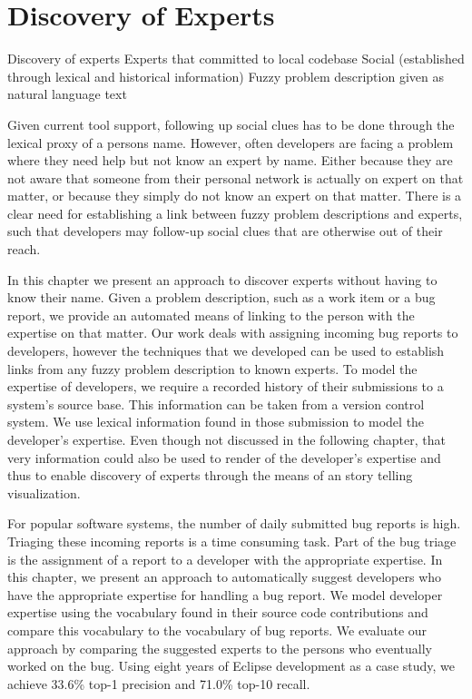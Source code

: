 \documentclass[10pt]{book}
\begin{document}

\chapter{Discovery of Experts}
\label{the chapter on bug reports}

\infobox
	{Discovery of experts}
	{Experts that committed to local codebase}
	{Social (established through lexical and historical information)}
	{Fuzzy problem description given as natural language text}

Given current tool support, following up social clues has to be done through the lexical proxy of a persons name. However, often developers are facing a problem where they need help but not know an expert by name. Either because they are not aware that someone from their personal network is actually on expert on that matter, or because they simply do not know an expert on that matter. There is a clear need for establishing a link between fuzzy problem descriptions and experts, such that developers may follow-up social clues that are otherwise out of their reach. 

In this chapter we present an approach to discover experts without having to know their name. Given a problem description, such as a work item or a bug report, we provide an automated means of linking to the person with the expertise on that matter. Our work deals with assigning incoming bug reports to developers, however the techniques that we developed can be used to establish links from any fuzzy problem description to known experts. To model the expertise of developers, we require a recorded history of their submissions to a system's source base. This information can be taken from a version control system. We use lexical information found in those submission to model the developer's expertise. Even though not discussed in the following chapter, that very information could also be used to render \EVOCLOUDS of the developer's expertise and thus to enable discovery of experts through the means of an story telling visualization.

\asteriskasteriskasterisk

For popular software systems, the number of daily submitted bug reports is high. Triaging these incoming reports is a time consuming task. Part of the bug triage is the assignment of a report to a developer with the appropriate expertise. In this chapter, we present an approach to automatically suggest developers who have the appropriate expertise for handling a bug report. We model developer expertise using the vocabulary found in their source code contributions and compare this vocabulary to the vocabulary of bug reports. We evaluate our approach by comparing the suggested experts to the persons who eventually worked on the bug. Using eight years of Eclipse development as a case study, we achieve 33.6\% top-1 precision and 71.0\% top-10 recall.
\end{document}

